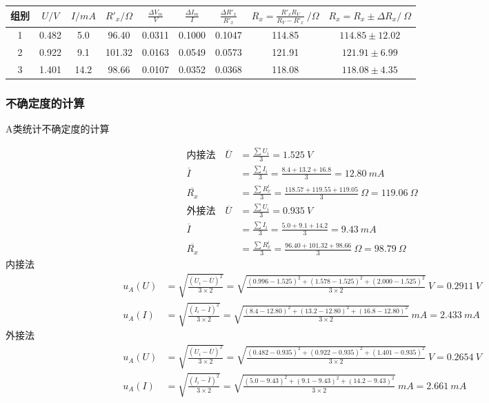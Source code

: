 \documentclass[UTF8]{ctexart}
\begin{document}
\begin{table}[H]
    \centering
    \begin{tabular}{|c|c|c|c|c|c|c|c|c|}
    \hline
        组别 &  $U/V$  &  $I/mA$  &  $R'_x/\Omega$  & $\frac{\Delta V_m}{V}$  & $\frac{\Delta I_m}{I}$  &  $\frac{\Delta R'_x}{R'_x}$  &  $ R_x = \frac{R'_xR_V}{R_V - R'_x} \ /\Omega$ &  $R_x = R_x \pm \Delta R_x /\ \Omega$\\
    \hline
         1   &  0.482  & 5.0  &  96.40  & 0.0311 &  0.1000  &  0.1047  & 114.85 &  $114.85 \pm 12.02 $ \\
    \hline
         2   &  0.922  & 9.1  &  101.32  & 0.0163 &  0.0549  &  0.0573  & 121.91 &  $121.91 \pm 6.99 $ \\
    \hline
         3   &  1.401  & 14.2  &  98.66  & 0.0107 &  0.0352  &  0.0368  & 118.08 &  $118.08 \pm 4.35 $  \\
    \hline
    \end{tabular}
\end{table}


\subsubsection{不确定度的计算}
A类统计不确定度的计算


\begin{align*}
  \text{内接法} \quad  \overline{U} &= \frac{\sum U_i}{3} = 1.525 \ V \\
  \overline{I} &= \frac{\sum I_i}{3} = \frac{8.4+13.2+16.8}{3} = 12.80 \ mA \\
  \overline{R_x} &= \frac{\sum R_x^i}{3} = \frac{118.57 + 119.55 + 119.05}{3} \ \Omega = 119.06 \ \Omega \\
   \text{外接法} \quad  \overline{U} &= \frac{\sum U_i}{3} = 0.935 \ V \\
  \overline{I} &= \frac{\sum I_i}{3} = \frac{5.0+9.1+14.2}{3} = 9.43 \ mA \\
  \overline{R_x} &= \frac{\sum R_x^i}{3} = \frac{96.40 +101.32 + 98.66}{3} \ \Omega = 98.79 \ \Omega 
\end{align*}
内接法
\begin{align*}
    u_A(U) &= \sqrt{\frac{(U_i-\overline{U})^2}{3\times 2}} = 
    \sqrt{\frac{(0.996-1.525)^2+(1.578-1.525)^2+(2.000-1.525)^2}{3\times 2}} \ V= 0.2911 \ V \\
    u_A(I) &= \sqrt{\frac{(I_i-\overline{I})^2}{3\times 2}} = 
    \sqrt{\frac{(8.4-12.80)^2+(13.2-12.80)^2+(16.8-12.80)^2}{3\times 2}} \ mA = 2.433 \ mA 
\end{align*}
外接法    
\begin{align*}
    u_A(U) &= \sqrt{\frac{(U_i-\overline{U})^2}{3\times 2}} = 
    \sqrt{\frac{(0.482-0.935)^2+(0.922-0.935)^2+(1.401-0.935)^2}{3\times 2}} \ V= 0.2654 \ V \\
    u_A(I) &= \sqrt{\frac{(I_i-\overline{I})^2}{3\times 2}} = 
    \sqrt{\frac{(5.0-9.43)^2+(9.1-9.43)^2+(14.2-9.43)^2}{3\times 2}} \ mA = 2.661 \ mA 
\end{align*}
\end{document}
